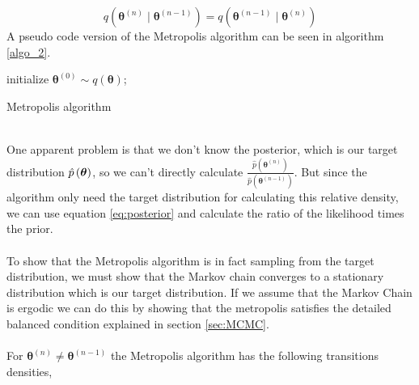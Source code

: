 \begin{equation*}
    q(\boldsymbol{\theta}^{(n)}\mid \boldsymbol{\theta}^{(n-1)})=q(\boldsymbol{\theta}^{(n-1)}\mid \boldsymbol{\theta}^{(n)})
\end{equation*}
A pseudo code version of the Metropolis algorithm can be seen in algorithm \ref{algo_2}.
\begin{algorithm}\label{algo_2}

\SetAlgoLined
initialize $\boldsymbol{\theta}^{(0)}\sim q(\boldsymbol{\theta})$;

\caption{Metropolis algorithm}
\end{algorithm}\\
One apparent problem is that we don't know the posterior, which is our target distribution $\hat{p}\left (\boldsymbol{\theta}\right)$, so we can't directly calculate $\frac{\hat{p}(\boldsymbol{\theta}^{(n)})}{\hat{p}\left(\boldsymbol{\theta}^{(n-1)}\right)}$. But since the algorithm only need the target distribution for calculating this relative density, we can use equation \ref{eq:posterior} and calculate the ratio of the likelihood times the prior. 
\\
\\
To show that the Metropolis algorithm is in fact sampling from the target distribution, we must show that the Markov chain converges to a stationary distribution which is our target distribution. If we assume that the Markov Chain is ergodic we can do this by showing that the metropolis satisfies the detailed balanced condition explained in section \ref{sec:MCMC}.\\
\\
For $\boldsymbol{\theta}^{(n)}\neq \boldsymbol{\theta}^{(n-1)}$ the Metropolis algorithm has the following transitions densities,
